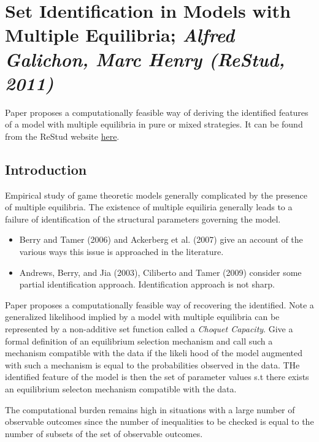 
\section{Set Identification in Models with Multiple Equilibria; \textit{\small Alfred Galichon, Marc Henry (ReStud, 2011)}}\label{sec:GH-2011}

Paper proposes a computationally feasible way of deriving the identified features of a model with multiple equilibria in pure or mixed strategies. It can be found from the ReStud website \href{https://academic.oup.com/restud/article/78/4/1264/1593470}{here}. 

\subsection{Introduction}

Empirical study of game theoretic models generally complicated by the presence of multiple equilibria. The existence of multiple equiliria generally leads to a failure of identification of the structural parameters governing the model. 
\begin{itemize}
	\item Berry and Tamer (2006) and Ackerberg et al. (2007) give an account of the various ways this issue is approached in the literature.
	\item Andrews, Berry, and Jia (2003),  Ciliberto and Tamer (2009) consider some partial identification approach. Identification approach is not sharp. 
\end{itemize}
Paper proposes a computationally feasible way of recovering the identified. Note a generalized likelihood implied by a model with multiple equilibria can be represented by a non-additive set function called a \textit{Choquet Capacity}.	Give a formal definition of an equilibrium selection mechanism and call such a mechanism compatible with the data if the likeli	hood of the model augmented with such a mechanism is equal to the probabilities observed in the data. THe identified feature of the model is then the set of parameter values s.t there exists an equilibrium selecton mechanism compatible with the data. 

The computational burden remains high in situations with a large number of observable outcomes since the number of inequalities to be checked is equal to the number of subsets of the set of observable outcomes. 

